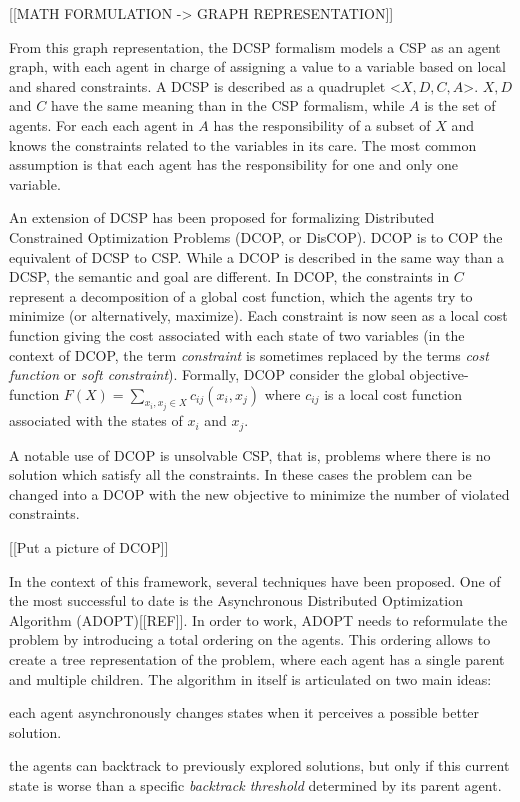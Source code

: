[[MATH FORMULATION -> GRAPH REPRESENTATION]]

From this graph representation, the DCSP formalism\cite{yokoo1998distributed} models a CSP  as an agent graph, with each agent in charge of assigning a value to a variable based on local and shared constraints. A DCSP is described as a quadruplet <$X, D, C, A$>. $X, D$ and $C$ have the same meaning than in the CSP formalism, while $A$ is the set of agents. For each each agent in $A$ has the responsibility of a subset of $X$ and knows the constraints related to the variables in its care. The most common assumption is that each agent has the responsibility for one and only one variable.

An extension of DCSP has been proposed for formalizing Distributed Constrained Optimization Problems (DCOP, or DisCOP). DCOP is to COP the equivalent of DCSP to CSP. While a DCOP is described in the same way than a DCSP, the semantic and goal are different.
In DCOP, the constraints in $C$ represent a decomposition of a global cost function, which the agents try to minimize (or alternatively, maximize). Each constraint is now seen as a local cost function giving the cost associated with each state of two variables (in the context of DCOP, the term \emph{constraint} is sometimes replaced by the terms \emph{cost function} or \emph{soft constraint}). Formally, DCOP consider the global objective-function $F(X) = \sum_{x_i, x_j \in X} c_{ij}(x_i,x_j)$ where $c_{ij}$ is a local cost function associated with the states of $x_i$ and $x_j$.

A notable use of DCOP is unsolvable CSP, that is, problems where there is no solution which satisfy all the constraints. In these cases the problem can be changed into a DCOP with the new objective to minimize the number of violated constraints.

[[Put a picture of DCOP]]

In the context of this framework, several techniques have been proposed. One of the most successful to date is the Asynchronous Distributed Optimization Algorithm (ADOPT)[[REF]]. In order to work, ADOPT needs to reformulate the problem by introducing a total ordering on the agents. This ordering allows to create a tree representation of the problem, where each agent has a single parent and multiple children. The algorithm in itself is articulated on two main ideas:
\begin{compactitem}
\item each agent asynchronously changes states when it perceives a possible better solution.
\item the agents can backtrack to previously explored solutions, but only if this current state is worse than a specific \emph{backtrack threshold} determined by its parent agent.
\end{compactitem}

